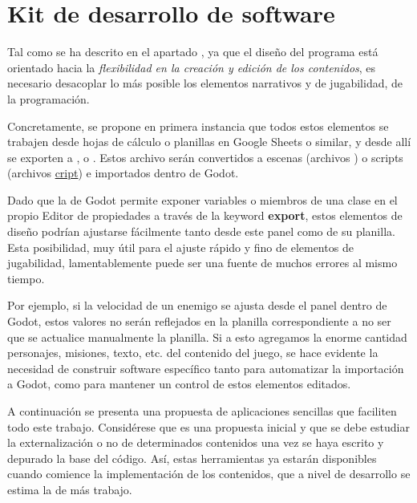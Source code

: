 
\section{Kit de desarrollo de software}\label{kit:kit-de-desarrollo}

Tal como se ha descrito en el apartado , ya que el diseño del programa está orientado hacia la \emph{flexibilidad en la creación y edición de los contenidos}, es necesario desacoplar lo más posible los elementos narrativos y de jugabilidad, de la programación.

Concretamente, se propone en primera instancia que todos estos elementos se trabajen desde hojas de cálculo o planillas en Google Sheets o similar, y desde allí se exporten a ,  o . Estos archivo serán convertidos a escenas (archivos \href{https://docs.godotengine.org/es/stable/development/file_formats/tscn.html}{}) o scripts (archivos \href{https://docs.godotengine.org/es/stable/development/file_formats/gdscript_grammar.html}{cript}) e importados dentro de Godot.

Dado que la  de Godot permite exponer variables o miembros de una clase en el propio Editor de propiedades a través de la keyword \textbf{export}, estos elementos de diseño podrían ajustarse fácilmente tanto desde este panel como de su planilla. Esta posibilidad, muy útil para el ajuste rápido y fino de elementos de jugabilidad, lamentablemente puede ser una fuente de muchos errores al mismo tiempo.

Por ejemplo, si la velocidad de un enemigo se ajusta desde el panel dentro de Godot, estos valores no serán reflejados en la planilla correspondiente a no ser que se actualice manualmente la planilla. Si a esto agregamos la enorme cantidad personajes, misiones, texto, etc. del contenido del juego, se hace evidente la necesidad de construir software específico tanto para automatizar la importación a Godot, como para mantener un control de estos elementos editados.

A continuación se presenta una propuesta de aplicaciones sencillas que faciliten todo este trabajo. Considérese que es una propuesta inicial y que se debe estudiar la externalización o no de determinados contenidos una vez se haya escrito y depurado la base del código. Así, estas herramientas ya estarán disponibles cuando comience la implementación de los contenidos, que a nivel de desarrollo se estima la de más trabajo.

